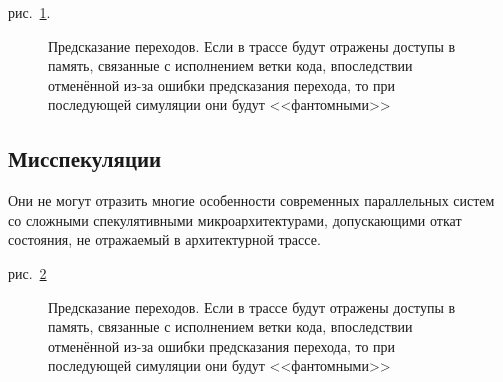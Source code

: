 рис.~\ref{fig:trace-parallel}.

\begin{figure}[htp]
    \centering
    \caption[Предсказание переходов]{Предсказание переходов. Если в трассе будут отражены доступы в память, связанные с исполнением ветки кода, впоследствии отменённой из-за ошибки предсказания перехода, то при последующей симуляции они будут <<фантомными>>}
    \label{fig:trace-parallel}
\end{figure}

\subsection{Мисспекуляции}

\todo

Они не могут отразить многие особенности современных параллельных систем со сложными спекулятивными микроархитектурами, допускающими откат состояния, не отражаемый в архитектурной трассе.

рис.~\ref{fig:trace-misspeculation}

\begin{figure}[htp]
    \centering
    \caption[Предсказание переходов]{Предсказание переходов. Если в трассе будут отражены доступы в память, связанные с исполнением ветки кода, впоследствии отменённой из-за ошибки предсказания перехода, то при последующей симуляции они будут <<фантомными>>}
    \label{fig:trace-misspeculation}
\end{figure}

